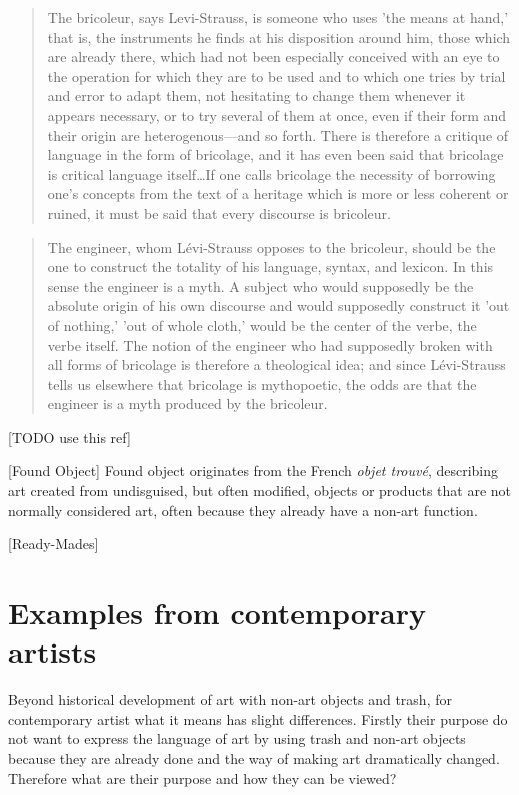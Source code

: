 \begin{quote}
The bricoleur, says Levi-Strauss, is someone who uses 'the means at hand,' that is, the instruments he finds at his disposition around him, those which are already there, which had not been especially conceived with an eye to the operation for which they are to be used and to which one tries by trial and error to adapt them, not hesitating to change them whenever it appears necessary, or to try several of them at once, even if their form and their origin are heterogenous---and so forth. There is therefore a critique of language in the form of bricolage, and it has even been said that bricolage is critical language itself\ldots If one calls bricolage the necessity of borrowing one's concepts from the text of a heritage which is more or less coherent or ruined, it must be said that every discourse is bricoleur.\cite{derrida1993structure}
\end{quote}

\begin{quote}
The engineer, whom Lévi-Strauss opposes to the bricoleur, should be the one to construct the totality of his language, syntax, and lexicon. In this sense the engineer is a myth. A subject who would supposedly be the absolute origin of his own discourse and would supposedly construct it 'out of nothing,' 'out of whole cloth,' would be the center of the verbe, the verbe itself. The notion of the engineer who had supposedly broken with all forms of bricolage is therefore a theological idea; and since Lévi-Strauss tells us elsewhere that bricolage is mythopoetic, the odds are that the engineer is a myth produced by the bricoleur.\cite{derrida1993structure}
\end{quote}

[TODO use this ref]\cite{strasser1999waste}



%
%
[Found Object] Found object originates from the French \textit{objet trouvé}, describing art created from undisguised, but often modified, objects or products that are not normally considered art, often because they already have a non-art function.






%
%
[Ready-Mades]





%
%
\section{Examples from contemporary artists}
Beyond historical development of art with non-art objects and trash, for contemporary artist what it means has slight differences. Firstly their purpose do not want to express the language of art by using trash and non-art objects because they are already done and the way of making art dramatically changed. Therefore what are their purpose and how they can be viewed?


